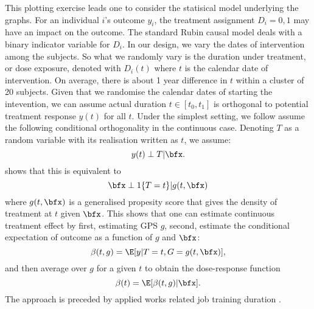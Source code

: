 This plotting exercise leads one to consider the statisical model underlying the graphs. For an individual $i$'s outcome $y_{i}$, the treatment assignment $D_{i}=0,1$ may have an impact on the outcome. The standard Rubin causal model deals with a binary indicator variable for $D_{i}$. In our design, we vary the dates of intervention among the subjects. So what we randomly vary is the duration under treatment, or dose exposure, denoted with $D_{i}(t)$ where $t$ is the calendar date of intervention. On average, there is about 1 year difference in $t$ within a cluster of 20 subjects. Given that we randomise the calendar dates of starting the intevention, we can assume actual duration $t\in[t_{0}, t_{1}]$ is orthogonal to potential treatment response $y(t)$ for all $t$. Under the simplest setting, we follow \citet{Imbens2000, HiranoImbens2004, ImaiVanDyk2004, Egger2013} assume the following conditional orthogonality in the continuous case. Denoting $T$ as a random variable with its realisation written as $t$, we assume:
\[
y(t)\perp T|\bfx.
\]
\citet{HiranoImbens2004} shows that this is equivalent to
\[
\bfx\perp 1\{T=t\}|g(t,\bfx)
\]
where $g(t,\bfx)$ is a generalised propesity score that gives the density of treatment at $t$ given $\bfx$. This shows that one can estimate continuous treatment effect by first, estimating GPS $g$, second, estimate the conditional expectation of outcome as a function of $g$ and $\bfx$:
\[
\beta(t, g)=\E[y|T=t, G=g(t,\bfx)],
\]
and then average over $g$ for a given $t$ to obtain the dose-response function
\[
\beta(t)=\E[\beta(t, g)|\bfx].
\]
The approach is preceded by applied works related job training duration \citep{Kluveetal2012}. 

